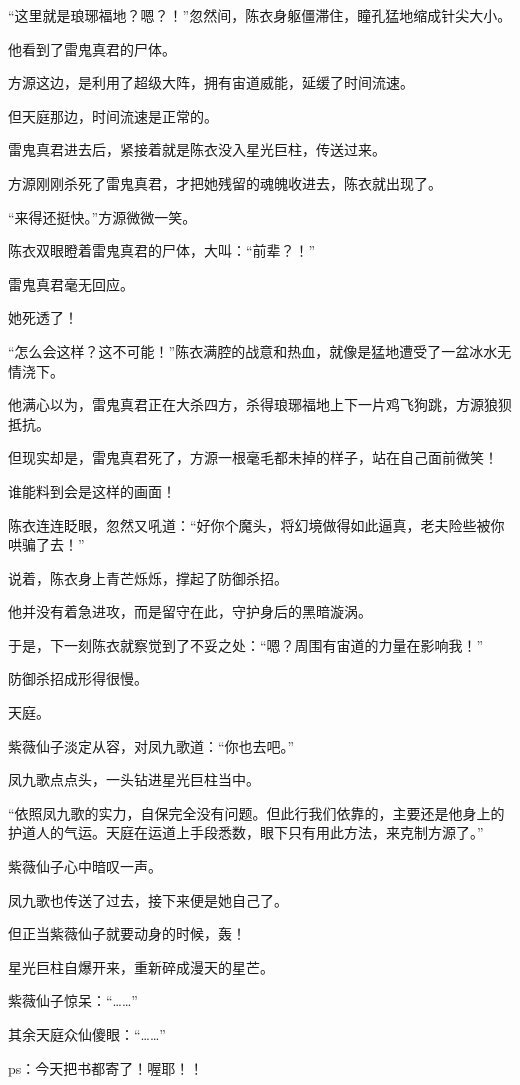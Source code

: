 \begin{this_body}
“这里就是琅琊福地？嗯？！”忽然间，陈衣身躯僵滞住，瞳孔猛地缩成针尖大小。

他看到了雷鬼真君的尸体。

方源这边，是利用了超级大阵，拥有宙道威能，延缓了时间流速。

但天庭那边，时间流速是正常的。

雷鬼真君进去后，紧接着就是陈衣没入星光巨柱，传送过来。

方源刚刚杀死了雷鬼真君，才把她残留的魂魄收进去，陈衣就出现了。

“来得还挺快。”方源微微一笑。

陈衣双眼瞪着雷鬼真君的尸体，大叫：“前辈？！”

雷鬼真君毫无回应。

她死透了！

“怎么会这样？这不可能！”陈衣满腔的战意和热血，就像是猛地遭受了一盆冰水无情浇下。

他满心以为，雷鬼真君正在大杀四方，杀得琅琊福地上下一片鸡飞狗跳，方源狼狈抵抗。

但现实却是，雷鬼真君死了，方源一根毫毛都未掉的样子，站在自己面前微笑！

谁能料到会是这样的画面！

陈衣连连眨眼，忽然又吼道：“好你个魔头，将幻境做得如此逼真，老夫险些被你哄骗了去！”

说着，陈衣身上青芒烁烁，撑起了防御杀招。

他并没有着急进攻，而是留守在此，守护身后的黑暗漩涡。

于是，下一刻陈衣就察觉到了不妥之处：“嗯？周围有宙道的力量在影响我！”

防御杀招成形得很慢。

天庭。

紫薇仙子淡定从容，对凤九歌道：“你也去吧。”

凤九歌点点头，一头钻进星光巨柱当中。

“依照凤九歌的实力，自保完全没有问题。但此行我们依靠的，主要还是他身上的护道人的气运。天庭在运道上手段悉数，眼下只有用此方法，来克制方源了。”

紫薇仙子心中暗叹一声。

凤九歌也传送了过去，接下来便是她自己了。

但正当紫薇仙子就要动身的时候，轰！

星光巨柱自爆开来，重新碎成漫天的星芒。

紫薇仙子惊呆：“……”

其余天庭众仙傻眼：“……”

ps：今天把书都寄了！喔耶！！

\end{this_body}

